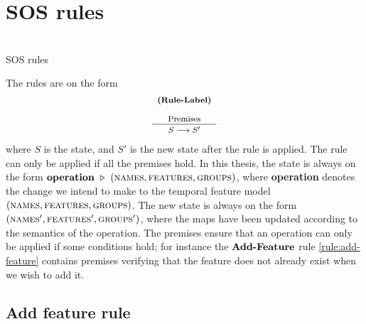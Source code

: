 \section{SOS rules}
\label{sec:sos-rules}



\\
SOS rules 

The rules are on the form 
$$\sossize\begin{array}{c}
    \ntyperule{Rule-Label}
    { \\
    \text{Premises}}
    { S \transition S'}
  \end{array}$$
  where $S$ is the state, and $S'$ is the new state after the rule is applied. The rule can only be applied if all the premises hold. In this thesis, the state is always on the form $\textbf{operation} \ \triangleright \  (\textsc{names}{}, \textsc{features}{}, \textsc{groups}{}{})$, where \textbf{operation} denotes the change we intend to make to the temporal feature model $(\textsc{names}{}, \textsc{features}{}, \textsc{groups}{}{})$. The new state is always on the form $(\textsc{names}{}', \textsc{features}{}', \textsc{groups}{}{}')$, where the maps have been updated according to the semantics of the operation. The premises ensure that an operation can only be applied if some conditions hold; for instance the $\textbf{Add-Feature}$ rule \ref{rule:add-feature} contains premises verifying that the feature does not already exist when we wish to add it. 

\subsection{Add feature rule}
\label{sub:add-feature-rule}

